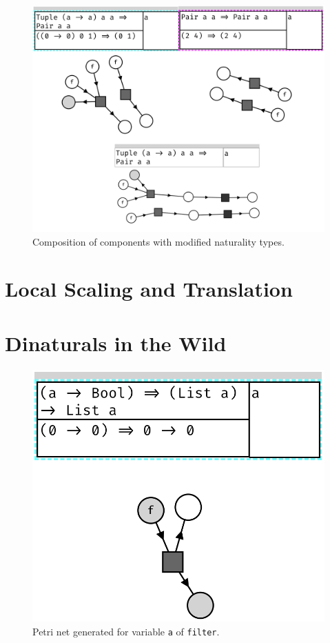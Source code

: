 \documentclass[11pt,openright,hidelinks,a4paper]{article}
\begin{document}
\begin{figure}[H]
\begin{center}
\includegraphics[scale=0.45]{natcompose}
\end{center}
\caption{Composition of components with modified naturality types.}
\label{fig:natcompose2}
\end{figure}

\section{Local Scaling and Translation}\label{app:zoomtrans}

\section{Dinaturals in the Wild}\label{app:wilddinaturals}

\begin{figure}[H]
\begin{center}
\includegraphics[scale=0.45]{filter}
\end{center}
\caption{Petri net generated for variable \lstinline{a} of \lstinline{filter}.}
\label{fig:filter}
\end{figure}
\end{document}
